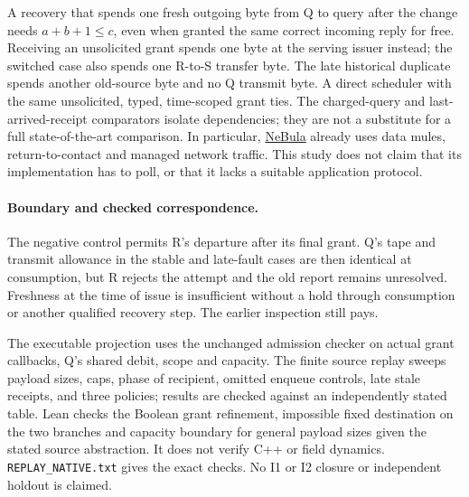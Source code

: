 \documentclass{article}
\begin{document}
A recovery that spends one fresh outgoing byte from Q to query
after the change needs \(a+b+1\le c\), even when granted the same
correct incoming reply for free. Receiving an unsolicited grant
spends one byte at the serving issuer instead; the switched
case also spends one R-to-S transfer byte. The late historical
duplicate spends another old-source byte and no Q transmit byte.
A direct scheduler with the same unsolicited, typed, time-scoped
grant ties. The charged-query and last-arrived-receipt
comparators isolate dependencies; they are not a substitute
for a full state-of-the-art comparison. In particular,
\href{https://arxiv.org/html/2103.11470}{NeBula} already uses data
mules, return-to-contact and managed network traffic. This
study does not claim that its implementation has to poll,
or that it lacks a suitable application protocol.

\paragraph{Boundary and checked correspondence.}
The negative control permits R's departure after its final grant.
Q's tape and transmit allowance in the stable and late-fault
cases are then identical at consumption, but R rejects the
attempt and the old report remains unresolved. Freshness at the
time of issue is insufficient without a hold through consumption
or another qualified recovery step. The earlier inspection still pays.

The executable projection uses the unchanged admission checker
on actual grant callbacks, Q's shared debit, scope and capacity.
The finite source replay sweeps payload sizes, caps, phase of
recipient, omitted enqueue controls, late stale receipts, and
three policies; results are checked against an independently
stated table. Lean checks the Boolean grant refinement,
impossible fixed destination on the two branches and capacity
boundary for general payload sizes given the stated source
abstraction. It does not verify C++ or field dynamics.
\texttt{REPLAY\_NATIVE.txt} gives the exact checks. No I1 or I2 closure
or independent holdout is claimed.
\end{document}
